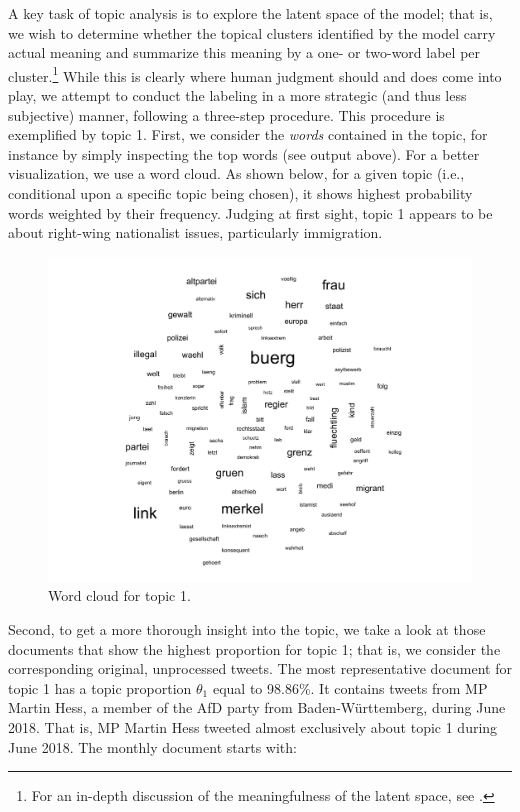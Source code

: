 \noindent
A key task of topic analysis is to explore the latent space of the model; that is, we wish to determine whether the topical clusters identified by the model carry actual meaning and summarize this meaning by a one- or two-word label per cluster.\footnote{For an in-depth discussion of the meaningfulness of the latent space, see \cite{chang2009reading}.} While this is clearly where human judgment should and does come into play, we attempt to conduct the labeling in a more strategic (and thus less subjective) manner, following a three-step procedure. This procedure is exemplified by topic 1. First, we consider the \textit{words} contained in the topic, for instance by simply inspecting the top words (see output above). For a better visualization, we use a word cloud. As shown below, for a given topic (i.e., conditional upon a specific topic being chosen), it shows highest probability words weighted by their frequency. Judging at first sight, topic 1 appears to be about right-wing nationalist issues, particularly immigration.

\begin{figure}[h!]
  \centering
  \captionsetup{justification=centering,margin=2cm}
  \includegraphics[scale = 0.5]{../plots/4_2/t1_wordcloud.pdf}
  \caption{Word cloud for topic 1.}
  \label{fig:t1_wordcloud}
\end{figure}

Second, to get a more thorough insight into the topic, we take a look at those documents that show the highest proportion for topic 1; that is, we consider the corresponding original, unprocessed tweets. The most representative document for topic 1 has a topic proportion $\theta_1$ equal to 98.86\%. It contains tweets from MP Martin Hess, a member of the AfD party from Baden-Württemberg, during June 2018. That is, MP Martin Hess tweeted almost exclusively about topic 1 during June 2018. The monthly document starts with:


